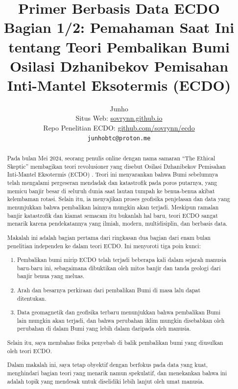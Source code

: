 \documentclass[10pt,twocolumn,letterpaper]{article}
\begin{document}
\title{Primer Berbasis Data ECDO Bagian 1/2: Pemahaman Saat Ini tentang Teori Pembalikan Bumi Osilasi Dzhanibekov Pemisahan Inti-Mantel Eksotermis (ECDO)}

\author{Junho\\
Situs Web: \href{https://sovrynn.github.io}{sovrynn.github.io}\\
Repo Penelitian ECDO: \href{https://github.com/sovrynn/ecdo}{github.com/sovrynn/ecdo}\\
{\tt\small junhobtc@proton.me}
}

\maketitle

\begin{abstract}
Pada bulan Mei 2024, seorang penulis online dengan nama samaran “The Ethical Skeptic” \cite{0} membagikan teori revolusioner yang disebut Osilasi Dzhanibekov Pemisahan Inti-Mantel Eksotermis (ECDO) \cite{1}. Teori ini menyarankan bahwa Bumi sebelumnya telah mengalami pergeseran mendadak dan katastrofik pada poros putarnya, yang memicu banjir besar di seluruh dunia saat lautan tumpah ke benua-benua akibat kelembaman rotasi. Selain itu, ia menyajikan proses geofisika penjelasan dan data yang menunjukkan bahwa pembalikan lainnya mungkin akan terjadi. Meskipun ramalan banjir katastrofik dan kiamat semacam itu bukanlah hal baru, teori ECDO sangat menarik karena pendekatannya yang ilmiah, modern, multidisiplin, dan berbasis data.

Makalah ini adalah bagian pertama dari ringkasan dua bagian dari enam bulan penelitian independen \cite{2,20} ke dalam teori ECDO. Ini menyoroti tiga poin kunci:

\begin{flushleft}
\begin{enumerate}
    \item Pembalikan bumi mirip ECDO telah terjadi beberapa kali dalam sejarah manusia baru-baru ini, sebagaimana dibuktikan oleh mitos banjir dan tanda geologi dari banjir benua yang meluas.
    \item Arah dan besarnya perkiraan dari pembalikan Bumi di masa lalu dapat ditentukan.
    \item Data geomagnetik dan geofisika terbaru menunjukkan bahwa pembalikan Bumi lain mungkin akan terjadi, dan bahwa perubahan iklim mungkin disebabkan oleh perubahan di dalam Bumi yang lebih dalam daripada oleh manusia.
\end{enumerate}
\end{flushleft}

Selain itu, saya membahas fisika penyebab di balik pembalikan bumi yang diusulkan oleh teori ECDO.

Dalam makalah ini, saya tetap obyektif dengan berfokus pada data yang kuat, menghindari bagian teori yang menarik namun spekulatif, dan menekankan bahwa ini adalah topik yang mendesak untuk diselidiki lebih lanjut oleh umat manusia.
\end{abstract}
\end{document}
